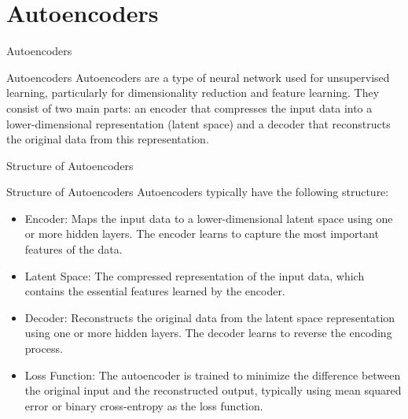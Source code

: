 \documentclass[hyperref={pdfpagelabels=false},aspectratio=169]{beamer}
\begin{document}
\section{Autoencoders}
\label{sec:org5dfe9da}
\begin{frame}[label={sec:orgb3ce7ae}]{Autoencoders}
\begin{block}{Autoencoders}
\pause
\alert{Autoencoders} are a type of neural network used for unsupervised learning, particularly for dimensionality reduction and feature learning. They consist of two main parts: an encoder that compresses the input data into a lower-dimensional representation (latent space) and a decoder that reconstructs the original data from this representation.
\end{block}
\end{frame}
\begin{frame}[label={sec:org6538089}]{Structure of Autoencoders}
\begin{block}{Structure of Autoencoders}
\pause
Autoencoders typically have the following structure:
\begin{itemize}[<+->]
\item \alert{\alert{Encoder}}: Maps the input data to a lower-dimensional latent space using one or more hidden layers. The encoder learns to capture the most important features of the data.
\item \alert{\alert{Latent Space}}: The compressed representation of the input data, which contains the essential features learned by the encoder.
\item \alert{\alert{Decoder}}: Reconstructs the original data from the latent space representation using one or more hidden layers. The decoder learns to reverse the encoding process.
\item \alert{\alert{Loss Function}}: The autoencoder is trained to minimize the difference between the original input and the reconstructed output, typically using mean squared error or binary cross-entropy as the loss function.
\end{itemize}
\end{block}
\end{frame}
\end{document}
